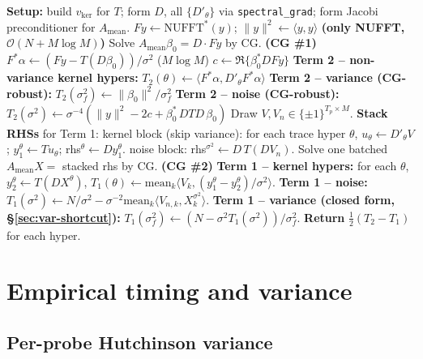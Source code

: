 \documentclass[11pt]{article}
\newcommand{\bigo}{\mathcal{O}}
\begin{document}
\begin{algorithm}[h]
\caption{Full log-marginal gradient with a single NUFFT and 2 CG calls.}
\label{algo:full}
\begin{algorithmic}[1]
\State \textbf{Setup:} build $v_{\text{ker}}$ for $T$; form $D$, all $\{D'_\theta\}$ via \texttt{spectral\_grad}; form Jacobi preconditioner for $A_{\text{mean}}$.
\State $Fy \leftarrow \text{NUFFT}^*(y)$; $\|y\|^2 \leftarrow \langle y, y\rangle$
\hfill\textbf{(only NUFFT, $\bigo(N + M\log M)$)}
\State Solve $A_{\text{mean}}\beta_0 = D\cdot Fy$ by CG. \hfill\textbf{(CG \#1)}
\State $F^*\alpha \leftarrow (Fy - T(D\beta_0))/\sigma^2$
\hfill ($M\log M$)
\State $c \leftarrow \Re\{\beta_0^* D Fy\}$
\State \textbf{Term 2 -- non-variance kernel hypers:}  $T_2(\theta) \leftarrow \langle F^*\alpha, D'_\theta F^*\alpha\rangle$
\State \textbf{Term 2 -- variance (CG-robust):}  $T_2(\sigma_f^2) \leftarrow \|\beta_0\|^2/\sigma_f^2$
\State \textbf{Term 2 -- noise (CG-robust):}  $T_2(\sigma^2) \leftarrow \sigma^{-4}(\|y\|^2 - 2c + \beta_0^*\,DTD\,\beta_0)$
\State Draw $V, V_n \in\{\pm1\}^{T_p\times M}$.
\State \textbf{Stack RHSs} for Term 1:
\State \quad kernel block (skip variance): for each trace hyper $\theta$, $u_\theta\leftarrow D'_\theta V$; $y_1^\theta\leftarrow T u_\theta$; rhs$^\theta\leftarrow D y_1^\theta$.
\State \quad noise block: rhs$^{\sigma^2}\leftarrow D\,T(D V_n)$.
\State Solve one batched $A_{\text{mean}} X = $ stacked rhs by CG. \hfill\textbf{(CG \#2)}
\State \textbf{Term 1 -- kernel hypers:} for each $\theta$, $y_2^\theta\leftarrow T(D X^\theta)$, $T_1(\theta) \leftarrow \mathrm{mean}_k\langle V_k, (y_1^\theta - y_2^\theta)/\sigma^2\rangle$.
\State \textbf{Term 1 -- noise:} $T_1(\sigma^2) \leftarrow N/\sigma^2 - \sigma^{-2}\mathrm{mean}_k\langle V_{n,k}, X^{\sigma^2}_k\rangle$.
\State \textbf{Term 1 -- variance (closed form, \S\ref{sec:var-shortcut}):} $T_1(\sigma_f^2) \leftarrow (N - \sigma^2 T_1(\sigma^2))/\sigma_f^2$.
\State \textbf{Return} $\tfrac12(T_2 - T_1)$ for each hyper.
\end{algorithmic}
\end{algorithm}

\section{Empirical timing and variance}
\label{sec:variance}

\subsection{Per-probe Hutchinson variance}
\end{document}
